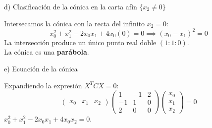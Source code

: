 {d) Clasificación de la cónica en la carta afín $\{x_2 \neq 0\}$

Intersecamos la cónica con la recta del infinito $x_2 = 0$:
\[
x_0^2 + x_1^2 - 2x_0x_1 + 4x_0(0) = 0 \implies (x_0 - x_1)^2 = 0
\]
La intersección produce un único punto real doble $(1:1:0)$. \\
 La cónica es una \textbf{parábola}.

e) Ecuación de la cónica

Expandiendo la expresión $X^T C X = 0$:
\[
\begin{pmatrix} x_0 & x_1 & x_2 \end{pmatrix} \begin{pmatrix} 1 & -1 & 2 \\ -1 & 1 & 0 \\ 2 & 0 & 0 \end{pmatrix} \begin{pmatrix} x_0 \\ x_1 \\ x_2 \end{pmatrix} = 0
\]
 $x_0^2 + x_1^2 - 2x_0x_1 + 4x_0x_2 = 0$.


}

